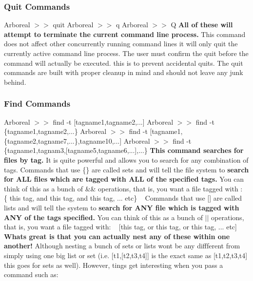 \subsubsection*{Quit Commands}

Arboreal $>$$>$ quit Arboreal $>$$>$ q Arboreal $>$$>$ Q {\bfseries All of these will attempt to terminate the current command line process.} This command does not affect other concurrently running command lines it will only quit the currently active command line process. The user must confirm the quit before the command will actually be executed. this is to prevent accidental quits. The quit commands are built with proper cleanup in mind and should not leave any junk behind. ~\newline
 \subsubsection*{Find Commands}

Arboreal $>$$>$ find -\/t \mbox{[}tagname1,tagname2,...\mbox{]} Arboreal $>$$>$ find -\/t \{tagname1,tagname2,...\} Arboreal $>$$>$ find -\/t \mbox{[}tagname1,\{tagname2,tagname7,...\},tagname10,...\mbox{]} Arboreal $>$$>$ find -\/t \{tagname1,tagnam3,\mbox{[}tagname5,tagname6,...\mbox{]},...\} {\bfseries This command searches for files by tag.} It is quite powerful and allows you to search for any combination of tags. Commands that use {\ttfamily \{\}} are called {\ttfamily sets} and will tell the file system to {\bfseries search for A\+LL files which are tagged with A\+LL of the specified tags.} You can think of this as a bunch of {\ttfamily \&\&} operations, that is, you want a file tagged with \+: ~\newline
 {\ttfamily \{ this tag, and this tag, and this tag, ... etc\}} ~\newline
 Commands that use {\ttfamily \mbox{[}\mbox{]}} are called {\ttfamily lists} and will tell the system to {\bfseries search for A\+NY file which is tagged with A\+NY of the tags specified.} You can think of this as a bunch of {\ttfamily $\vert$$\vert$} operations, that is, you want a file tagged with\+: ~\newline
 {\ttfamily \mbox{[}this tag, or this tag, or this tag, ... etc\mbox{]}} ~\newline
 {\bfseries What\textquotesingle{}s great is that you can actually nest any of these within one another!} Although nesting a bunch of {\ttfamily sets} or {\ttfamily lists} won\textquotesingle{}t be any diffferent from simply using one big list or set (i.\+e. {\ttfamily \mbox{[}t1,\mbox{[}t2,t3,t4\mbox{]}\mbox{]}} is the exact same as {\ttfamily \mbox{[}t1,t2,t3,t4\mbox{]}} this goes for {\ttfamily sets} as well). However, tings get interesting when you pass a command such as\+:

